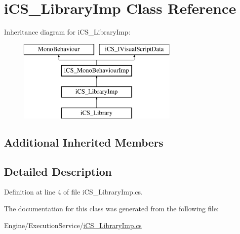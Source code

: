 \hypertarget{classi_c_s___library_imp}{\section{i\+C\+S\+\_\+\+Library\+Imp Class Reference}
\label{classi_c_s___library_imp}
}
Inheritance diagram for i\+C\+S\+\_\+\+Library\+Imp\+:\begin{figure}[H]
\begin{center}
\leavevmode
\includegraphics[height=4.000000cm]{classi_c_s___library_imp}
\end{center}
\end{figure}
\subsection*{Additional Inherited Members}


\subsection{Detailed Description}


Definition at line 4 of file i\+C\+S\+\_\+\+Library\+Imp.\+cs.



The documentation for this class was generated from the following file\+:\begin{DoxyCompactItemize}
\item 
Engine/\+Execution\+Service/\hyperlink{i_c_s___library_imp_8cs}{i\+C\+S\+\_\+\+Library\+Imp.\+cs}\end{DoxyCompactItemize}
